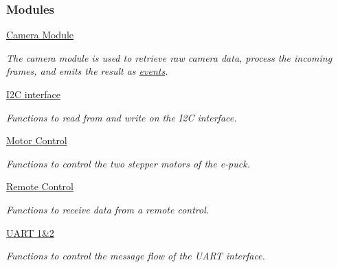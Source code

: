 \subsubsection*{Modules}
\begin{DoxyCompactItemize}
\item 
\hyperlink{group__camera}{Camera Module}
\begin{DoxyCompactList}\small\item\em The camera module is used to retrieve raw camera data, process the incoming frames, and emits the result as \hyperlink{group__events}{events}. \end{DoxyCompactList}\item 
\hyperlink{group__i2c}{I2\+C interface}
\begin{DoxyCompactList}\small\item\em Functions to read from and write on the I2\+C interface. \end{DoxyCompactList}\item 
\hyperlink{group__motors}{Motor Control}
\begin{DoxyCompactList}\small\item\em Functions to control the two stepper motors of the e-\/puck. \end{DoxyCompactList}\item 
\hyperlink{group__remotecontrol}{Remote Control}
\begin{DoxyCompactList}\small\item\em Functions to receive data from a remote control. \end{DoxyCompactList}\item 
\hyperlink{group__uart}{U\+A\+R\+T 1\&2}
\begin{DoxyCompactList}\small\item\em Functions to control the message flow of the U\+A\+R\+T interface. \end{DoxyCompactList}\end{DoxyCompactItemize}
